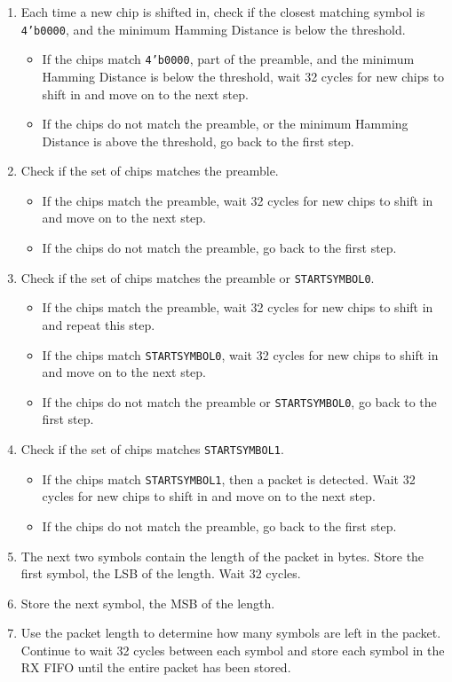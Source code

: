 \begin{enumerate}
	\item Each time a new chip is shifted in, check if the closest matching symbol is \texttt{4'b0000}, and the minimum Hamming Distance is below the threshold.
	\begin{itemize}
		\item If the chips match \texttt{4'b0000}, part of the preamble, and the minimum Hamming Distance is below the threshold, wait 32 cycles for new chips to shift in and move on to the next step.
		\item If the chips do not match the preamble, or the minimum Hamming Distance is above the threshold, go back to the first step.
	\end{itemize}
	\item Check if the set of chips matches the preamble.
	\begin{itemize}
		\item If the chips match the preamble, wait 32 cycles for new chips to shift in and move on to the next step.
		\item If the chips do not match the preamble, go back to the first step.
	\end{itemize}
	\item Check if the set of chips matches the preamble or \texttt{STARTSYMBOL0}.
	\begin{itemize}
		\item If the chips match the preamble, wait 32 cycles for new chips to shift in and repeat this step.
		\item If the chips match \texttt{STARTSYMBOL0}, wait 32 cycles for new chips to shift in and move on to the next step.
		\item If the chips do not match the preamble or \texttt{STARTSYMBOL0}, go back to the first step.
	\end{itemize}
	\item Check if the set of chips matches \texttt{STARTSYMBOL1}.
	\begin{itemize}
		\item If the chips match \texttt{STARTSYMBOL1}, then a packet is detected. Wait 32 cycles for new chips to shift in and move on to the next step.
		\item If the chips do not match the preamble, go back to the first step.
	\end{itemize}
	\item The next two symbols contain the length of the packet in bytes. Store the first symbol, the LSB of the length. Wait 32 cycles.
	\item Store the next symbol, the MSB of the length.
	\item Use the packet length to determine how many symbols are left in the packet. Continue to wait 32 cycles between each symbol and store each symbol in the RX FIFO until the entire packet has been stored.
\end{enumerate}

